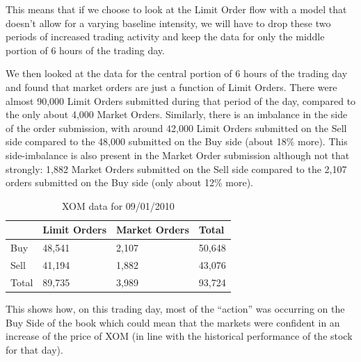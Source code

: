 This means that if we choose to look at the Limit Order flow with a model that doesn't allow for a varying baseline intensity, we will have to drop these two periods of increased trading activity and keep the data for only the middle portion of 6 hours of the trading day.


We then looked at the data for the central portion of 6 hours of the trading day and found that market orders are just a function of Limit Orders. There were almost 90,000 Limit Orders submitted during that period of the day, compared to the only about 4,000 Market Orders. Similarly, there is an imbalance in the side of the order submission, with around 42,000 Limit Orders submitted on the Sell side compared to the 48,000 submitted on the Buy side (about 18\% more). This side-imbalance is also present in the Market Order submission although not that strongly: 1,882 Market Orders submitted on the Sell side compared to the 2,107 orders submitted on the Buy side (only about 12\% more). 
	\begin{table}
	\centering
	\caption{XOM data for 09/01/2010 \label{tab:xom}}
	\begin{tabular}{llll} 
	& Limit Orders & Market Orders & Total \\ \hline
	Buy & 48,541 & 2,107 & 50,648 \\ 
	Sell & 41,194 & 1,882 & 43,076 \\
	Total & 89,735 & 3,989 & 93,724
	\end{tabular}
	\end{table}
This shows how, on this trading day, most of the ``action'' was occurring on the Buy Side of the book which could mean that the markets were confident in an increase of the price of XOM (in line with the historical performance of the stock for that day).


